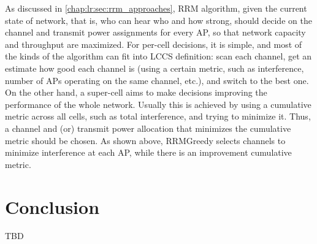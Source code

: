 As discussed in \ref{chap:lr:sec:rrm_approaches}, RRM algorithm, given the current state of network, that is, who can hear who and how strong, should decide on the channel and transmit power assignments for every AP, so that network capacity and throughput are maximized. For per-cell decisions, it is simple, and most of the kinds of the algorithm can fit into LCCS definition: scan each channel, get an estimate how good each channel is (using a certain metric, such as interference, number of APs operating on the same channel, etc.), and switch to the best one. On the other hand, a super-cell aims to make decisions improving the performance of the whole network. Usually this is achieved by using a cumulative metric across all cells, such as total interference, and trying to minimize it. Thus, a channel and (or) transmit power allocation that minimizes the cumulative metric should be chosen. As shown above, RRMGreedy selects channels to minimize interference at each AP, while there is an improvement cumulative metric.



\section{Conclusion}
\label{chap:research:sec:conclusion}
TBD